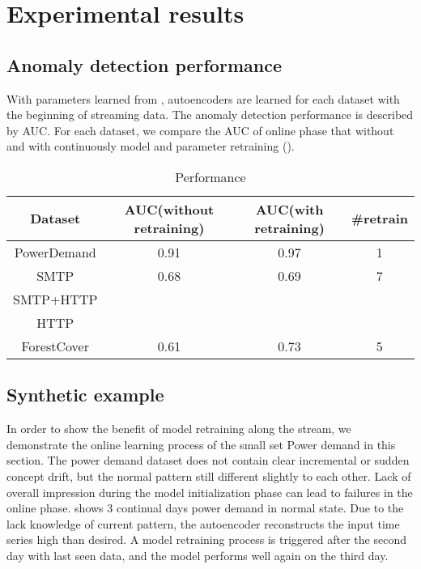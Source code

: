 \chapter{Experimental results}
\label{chap:results}


\section{Anomaly detection performance}
\label{sec:performance}

With parameters learned from , autoencoders are learned for each dataset with the beginning of streaming data. The anomaly detection performance is described by AUC. For each dataset, we compare the AUC of online phase that without and with continuously model and parameter retraining (). 

\begin{table}[h] 
\caption{Performance} 
\centering      
\begin{tabular}{c | c | c | c}  
\hline  
Dataset & AUC(without retraining) & AUC(with retraining) & \#retrain \\ 
\hline 
PowerDemand & 0.91 & 0.97 & 1  \\  
\hline 
SMTP & 0.68 & 0.69 & 7 \\ 
\hline 
SMTP+HTTP &  &  & \\ 
\hline 
HTTP &  &   &   \\ 
\hline 
ForestCover &0.61&0.73 & 5\\   
\hline    
\end{tabular}
\label{tab:performance}  
\end{table} 

\section{Synthetic example}
\label{sec:synthetic}

In order to show the benefit of model retraining along the stream, we demonstrate the online learning process of the small set Power demand in this section. The power demand dataset does not contain clear incremental or sudden concept drift, but the normal pattern still different slightly to each other. Lack of overall impression during the model initialization phase can lead to failures in the online phase.  shows 3 continual days power demand in normal state. Due to the lack knowledge of current pattern, the autoencoder reconstructs the input time series high than desired. A model retraining process is triggered after the second day with last seen data, and the model performs well again on the third day.

